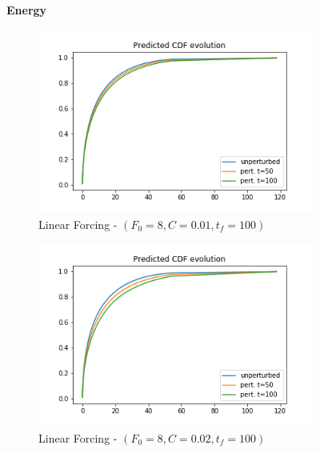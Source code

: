 \documentclass{article}
\begin{document}
\begin{figure}[!ht]
	\centering
	\textbf{Energy}\par\medskip
	\begin{subfigure}[b]{0.48\textwidth}
		\includegraphics[width=1\linewidth]{fig/pred_cdf_energy_bin_00q_10q_LF_8_001_0_100.png}
		\caption{Linear Forcing - $(F_0=8, C=0.01, t_f=100)$}
		\label{fig:pred_cdf_energy_bin_00q_10q_LF_8_001_0_100}
	\end{subfigure}%
	\begin{subfigure}[b]{0.48\textwidth}
		\includegraphics[width=1\linewidth]{fig/pred_cdf_energy_bin_00q_10q_LF_8_002_0_100.png}
		\caption{Linear Forcing - $(F_0=8, C=0.02, t_f=100)$}
		\label{fig:pred_cdf_energy_bin_00q_10q_LF_8_002_0_100}
	\end{subfigure}
	\begin{subfigure}[b]{0.48\textwidth}

\end{subfigure}
\end{figure}
\end{document}
